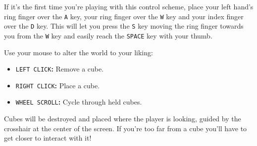 If it's the first time you're playing with this control scheme, place your left hand's ring finger over the \texttt{A} key, your ring finger over the \texttt{W} key and your index finger over the \texttt{D} key.
This will let you press the \texttt{S} key moving the ring finger towards you from the \texttt{W} key and easily reach the \texttt{SPACE} key with your thumb.

Use your mouse to alter the world to your liking:

\begin{itemize}
	\item
		\texttt{LEFT CLICK}\textbf{:}
		Remove a cube.
	\item
		\texttt{RIGHT CLICK}\textbf{:}
		Place a cube.
	\item
		\texttt{WHEEL SCROLL}\textbf{:}
		Cycle through held cubes.
\end{itemize}

Cubes will be destroyed and placed where the player is looking, guided by the crosshair at the center of the screen.
If you're too far from a cube you'll have to get closer to interact with it!
